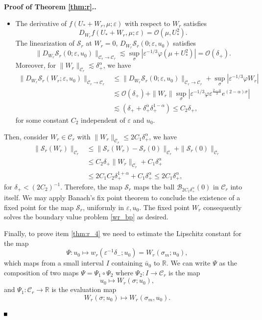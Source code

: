 \documentclass[letterpaper,11pt]{article}
\newcommand{\rmO}{\mathcal{O}}
\newcommand{\eps}{\varepsilon}
\newcommand{\lar}{ \lesssim }
\numberwithin{equation}{section}
\theoremstyle{plain}
\newenvironment{Proof}[1][\unskip]%
 {\begin{trivlist} \item[]{\bf Proof #1. }}%
 {\hspace*{\fill}$\rule{.4\baselineskip}{.4\baselineskip}$\end{trivlist}}
\begin{document}
\begin{Proof}[ of Theorem \ref{thm:r}.]
\begin{itemize}
\item The derivative of $f(U_*+W_r,\mu;\eps)$ with respect to $W_r$ satisfies 
\[
D_{W_r} f(U_*+W_r,\mu;\eps)=\rmO(\mu, U_*^2).
\] 
The linearization of $\mathcal{S}_r$ at $W_r=0$, $D_{W_r} \mathcal{S}_r(0;\eps,u_0)$ satisfies
\[
\|D_{W_r} \mathcal{S}_r(0;\eps,u_0)\|_{\mathcal{C}_r \to \mathcal{C}_r} \lar \sup_{\sigma}|\eps^{-1/3}\varphi(\mu+U_*^2)| = \rmO(\delta_+).
\]
Moreover, for $\|W_r\|_{\mathcal{C}_r} \lar \delta_+^{\alpha}$, we have 
\begin{align*}
\|D_{W_r}\mathcal{S}_r(W_r;\eps,u_0)\|_{\mathcal{C}_r \to \mathcal{C}_r} &\le  \|D_{W_r}\mathcal{S}_r(0;\eps,u_0)\|_{\mathcal{C}_r \to \mathcal{C}_r}+\sup_\sigma|\eps^{-1/3}\varphi W_r|\\
& \lar \rmO(\delta_+)+\|W_r\|\sup_{\sigma}|\eps^{-1/3}\varphi \eps^{\frac{2-\alpha}{3}} e^{(2-\alpha)\sigma}|\\
&\lar (\delta_+ + \delta_+^\alpha \delta_+^{1-\alpha}) \le C_2\delta_+,
\end{align*} 
for some constant $C_2$ independent of $\eps$ and $u_0$.
\end{itemize}

Then, consider $W_r\in \mathcal{C}_r$ with $\|W_r\|_{\mathcal{C}_r} \le 2C_1\delta_+^\alpha$, we have
\begin{equation}\label{fix_pt:estimate}
\begin{aligned}
\|\mathcal{S}_r(W_r)\|_{\mathcal{C}_r} &\le \|\mathcal{S}_r(W_r)-\mathcal{S}_r(0)\|_{\mathcal{C}_r}+\|\mathcal{S}_r(0)\|_{\mathcal{C}_r}\\
&\le C_2\delta_+\|W_r\|_{\mathcal{C}_r}+C_1\delta^\alpha_+\\
&\le  2C_1C_2\delta_+^{1+\alpha} + C_1\delta^\alpha_+ \le 2C_1\delta_+^\alpha, 
\end{aligned}
\end{equation}
for $\delta_+<(2C_2)^{-1}$.
Therefore, the map $\mathcal{S}_r$ maps the ball $\mathcal{B}_{2C_1\delta_+^\alpha}(0)$ in $\mathcal{C}_r$ into itself. We may apply Banach's fix point theorem to conclude the existence of a fixed point for the map $\mathcal{S}_r$, uniformly in $\eps, u_0$. The fixed point $W_r$ consequently solves the boundary value problem \eqref{wr_bp} as desired.


Finally, to prove item \ref{thm:r_4} we need to estimate the Lipschitz constant for the map 
\[
\Psi : u_0 \mapsto w_r(\eps^{-1}\delta_-; u_0)=W_r(\sigma_m;u_0),
\]
 which maps from a small interval $I$ containing $\bar{u}_0$ to $\mathbb{R}$. We can write $\Psi$ as the composition of two maps $\Psi = \Psi_1 \circ \Psi_2$ where $\Psi_2 : I \to \mathcal{C}_r$ is the map 
\[
 u_0 \mapsto W_r(\sigma; u_0),
\] 
and $\Psi_1 : \mathcal{C}_r \to \mathbb{R}$ is the evaluation map
\[
  W_r(\sigma; u_0) \mapsto W_r(\sigma_m, u_0).
\]
 

\end{Proof}
\end{document}
